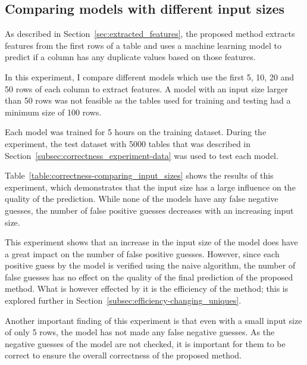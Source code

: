\subsection{Comparing models with different input sizes}\label{subsec:correctness_comparing-input-size}
As described in Section~\ref{sec:extracted_features}, the proposed method extracts features from the first rows of a table and uses a machine learning model to predict if a column has any duplicate values based on those features.

In this experiment, I compare different models which use the first \num{5}, \num{10}, \num{20} and \num{50} rows of each column to extract features. A model with an input size larger than \num{50} rows was not feasible as the tables used for training and testing had a minimum size of \num{100} rows.


Each model was trained for \num{5} hours on the training dataset. During the experiment, the test dataset with \num{5000} tables that was described in Section~\ref{subsec:correctness_experiment-data} was used to test each model.

Table~\ref{table:correctness-comparing_input_sizes} shows the results of this experiment, which demonstrates that the input size has a large influence on the quality of the prediction. While none of the models have any false negative guesses, the number of false positive guesses decreases with an increasing input size.


This experiment shows that an increase in the input size of the model does have a great impact on the number of false positive guesses. However, since each positive guess by the model is verified using the naive algorithm, the number of false guesses has no effect on the quality of the final prediction of the proposed method. What is however effected by it is the efficiency of the method; this is explored further in Section~\ref{subsec:efficiency-changing_uniques}.

Another important finding of this experiment is that even with a small input size of only \num{5} rows, the model has not made any false negative guesses. As the negative guesses of the model are not checked, it is important for them to be correct to ensure the overall correctness of the proposed method.

